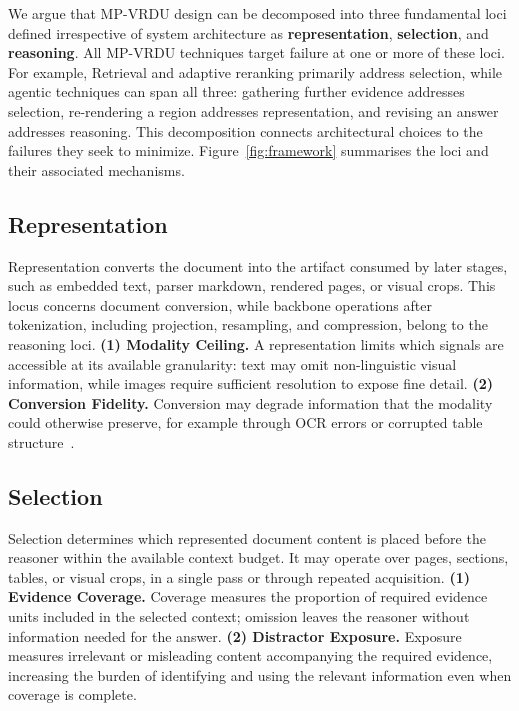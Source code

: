 \documentclass[11pt]{article}
\begin{document}
We argue that MP-VRDU design can be decomposed into three fundamental loci defined irrespective of system architecture as \textbf{representation}, \textbf{selection}, and \textbf{reasoning}. All MP-VRDU techniques target failure at one or more of these loci. For example, Retrieval and adaptive reranking primarily address selection, while agentic techniques can span all three: gathering further evidence addresses selection, re-rendering a region addresses representation, and revising an answer addresses reasoning. This decomposition connects architectural choices to the failures they seek to minimize. Figure~\ref{fig:framework} summarises the loci and their associated mechanisms.

\subsection{Representation}
\label{sec:fm_representation}

Representation converts the document into the artifact consumed by later stages, such as embedded text, parser markdown, rendered pages, or visual crops. This locus concerns document conversion, while backbone operations after tokenization, including projection, resampling, and compression, belong to the reasoning loci.
\textbf{(1) Modality Ceiling.} A representation limits which signals are accessible at its available granularity: text may omit non-linguistic visual information, while images require sufficient resolution to expose fine detail.
\textbf{(2) Conversion Fidelity.} Conversion may degrade information that the modality could otherwise preserve, for example through OCR errors or corrupted table structure~\citep{zhang2025ocr}.

\subsection{Selection}
\label{sec:fm_selection}

Selection determines which represented document content is placed before the reasoner within the available context budget. It may operate over pages, sections, tables, or visual crops, in a single pass or through repeated acquisition.
\textbf{(1) Evidence Coverage.} Coverage measures the proportion of required evidence units included in the selected context; omission leaves the reasoner without information needed for the answer.
\textbf{(2) Distractor Exposure.} Exposure measures irrelevant or misleading content accompanying the required evidence, increasing the burden of identifying and using the relevant information even when coverage is complete.
\end{document}
